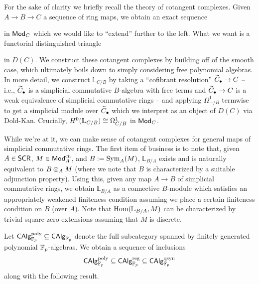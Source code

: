 \documentclass[11pt]{article}
\renewcommand{\L}{\mathbb{L}} %
\DeclareMathOperator{\cn}{cn} %
\DeclareMathOperator{\qsyn}{qsyn} %
\begin{document}
\begin{definition}
For the sake of clarity we briefly recall the theory of cotangent complexes. Given $A\to B\to C$ a sequence of ring maps, we obtain an exact sequence
\begin{center}
\end{center}
in $\operatorname{\mathsf{Mod}}_C$ which we would like to ``extend'' further to the left. What we want is a functorial distinguished triangle 
\begin{center}
\end{center}
in $D(C)$. We construct these cotangent complexes by building off of the smooth case, which ultimately boils down to simply considering free polynomial algebras. In more detail, we construct $\L_{C/B}$ by taking a ``cofibrant resolution'' $\widetilde{C}_{\bullet}\to C$ -- i.e., $\widetilde{C}_{\bullet}$ is a simplicial commutative $B$-algebra with free terms and $\widetilde{C}_{\bullet}\to C$ is a weak equivalence of simplicial commutative rings -- and applying $\Omega_{-/B}^1$ termwise to get a simplicial module over $\widetilde{C}_{\bullet}$ which we interpret as an object of $D(C)$ via Dold-Kan. Crucially, $H^0(\L_{C/B})\iso\Omega_{C/B}^1$ in $\operatorname{\mathsf{Mod}}_C$. 

While we're at it, we can make sense of cotangent complexes for general maps of simplicial commutative rings. The first item of business is to note that, given $A\in\operatorname{\mathsf{SCR}}$, $M\in\Mod_A^{\cn}$, and $B:=\operatorname{Sym}_A(M)$, $\L_{B/A}$ exists and is naturally equivalent to $B\otimes_AM$ (where we note that $B$ is characterized by a suitable adjunction property). Using this, given any map $A\to B$ of simplicial commutative rings, we obtain $\L_{B/A}$ as a connective $B$-module which satisfies an appropriately weakened finiteness condition assuming we place a certain finiteness condition on $B$ (over $A$). Note that $\Hom(\L_{B/A},M)$ can be characterized by trivial square-zero extensions assuming that $M$ is discrete.
\end{definition}

Let $\operatorname{\mathsf{CAlg}}_{\mathbb{F}_p}^{\operatorname{poly}}\subseteq\operatorname{\mathsf{CAlg}}_{\mathbb{F}_p}$ denote the full subcategory spanned by finitely generated polynomial $\mathbb{F}_p$-algebras. We obtain a sequence of inclusions
$$\CAlg_{\F_p}^{\poly}\subset\CAlg_{\F_p}^{\reg}\subset\CAlg_{\F_p}^{\qsyn}$$
along with the following result.
\end{document}
